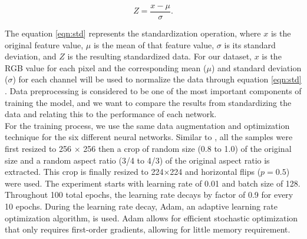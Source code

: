 \documentclass[10pt,twocolumn,letterpaper]{article}
\begin{document}
\begin{equation}
\label{eqn:std}
Z = \dfrac{x - \mu}{\sigma}.
\end{equation}

The equation \ref{eqn:std} represents the standardization operation, where $x$ is the original feature value, $\mu$ is the mean of that feature value, $\sigma$  is its standard deviation, and $Z$ is the resulting standardized data. 
For our dataset, $x$ is the RGB value for each pixel and the corresponding mean ($\mu$) and standard deviation ($\sigma$) for each channel will be used to normalize the data through equation \ref{eqn:std} . Data preprocessing is considered to be one of the most important components of training the model, and we want to compare the results from standardizing the data and relating this to the performance of each network. \\

 
For the training process, we use the same data augmentation and optimization technique for the six different neural networks. Similar to \cite{Xue2018dep}, all the samples were first resized to 256 $\times$ 256 then a crop of random size (0.8 to 1.0) of the original size and a random aspect ratio (3/4 to 4/3) of the original aspect ratio is extracted. This crop is finally resized to 224$\times$224 and horizontal flips ($p=0.5$) were used. The experiment starts with learning rate of 0.01 and batch size of 128. Throughout 100 total epochs, the learning rate decays by factor of 0.9 for every 10 epochs. During the learning rate decay, Adam, an adaptive learning rate optimization algorithm, is used. Adam allows for efficient stochastic optimization that only requires first-order gradients, allowing for little memory requirement\cite{Kingma2014adam}. 


{\small


}
\end{document}
